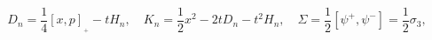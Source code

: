 \begin{equation}
D_n=\frac{1}{4}[x,p]_{{}_+}-tH_n,\quad
K_n=\frac{1}{2}x^2-2tD_n-t^2H_n,\quad
\Sigma=\frac{1}{2}[\psi^+,\psi^-]=\frac{1}{2}\sigma_3,
\label{qbos}
\end{equation}


